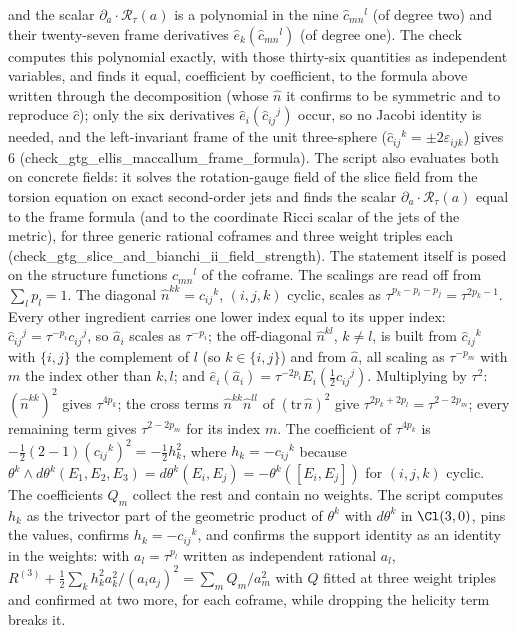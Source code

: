 and the scalar $\partial_{a}\cdot\mathcal{R}_{\tau}(a)$ is a polynomial in the nine $\hat c_{mn}{}^{l}$ (of degree two) and their twenty-seven frame derivatives $\hat e_{k}(\hat c_{mn}{}^{l})$ (of degree one). The check computes this polynomial exactly, with those thirty-six quantities as independent variables, and finds it equal, coefficient by coefficient, to the formula above written through the decomposition (whose $\hat n$ it confirms to be symmetric and to reproduce $\hat c$); only the six derivatives $\hat e_{i}(\hat c_{ij}{}^{j})$ occur, so no Jacobi identity is needed, and the left-invariant frame of the unit three-sphere ($\hat c_{ij}{}^{k} = \pm 2\varepsilon_{ijk}$) gives $6$ (check\_gtg\_ellis\_maccallum\_frame\_formula). The script also evaluates both on concrete fields: it solves the rotation-gauge field of the slice field from the torsion equation on exact second-order jets and finds the scalar $\partial_{a}\cdot\mathcal{R}_{\tau}(a)$ equal to the frame formula (and to the coordinate Ricci scalar of the jets of the metric), for three generic rational coframes and three weight triples each (check\_gtg\_slice\_and\_bianchi\_ii\_field\_strength). The statement itself is posed on the structure functions $c_{mn}{}^{l}$ of the coframe. The scalings are read off from $\sum_{l}p_{l} = 1$. The diagonal $\hat n^{kk} = \hat c_{ij}{}^{k}$, $(i, j, k)$ cyclic, scales as $\tau^{p_{k} - p_{i} - p_{j}} = \tau^{2p_{k} - 1}$. Every other ingredient carries one lower index equal to its upper index: $\hat c_{ij}{}^{j} = \tau^{-p_{i}}c_{ij}{}^{j}$, so $\hat a_{i}$ scales as $\tau^{-p_{i}}$; the off-diagonal $\hat n^{kl}$, $k \neq l$, is built from $\hat c_{ij}{}^{k}$ with $\{i, j\}$ the complement of $l$ (so $k \in \{i, j\}$) and from $\hat a$, all scaling as $\tau^{-p_{m}}$ with $m$ the index other than $k, l$; and $\hat e_{i}(\hat a_{i}) = \tau^{-2p_{i}}E_{i}(\tfrac12 c_{ij}{}^{j})$. Multiplying by $\tau^{2}$: $(\hat n^{kk})^{2}$ gives $\tau^{4p_{k}}$; the cross terms $\hat n^{kk}\hat n^{ll}$ of $(\mathrm{tr}\,\hat n)^{2}$ give $\tau^{2p_{k} + 2p_{l}} = \tau^{2 - 2p_{m}}$; every remaining term gives $\tau^{2 - 2p_{m}}$ for its index $m$. The coefficient of $\tau^{4p_{k}}$ is $-\tfrac12(2 - 1)(c_{ij}{}^{k})^{2} = -\tfrac12 h_{k}^{2}$, where $h_{k} = -c_{ij}{}^{k}$ because $\theta^{k}\wedge d\theta^{k}(E_{1}, E_{2}, E_{3}) = d\theta^{k}(E_{i}, E_{j}) = -\theta^{k}([E_{i}, E_{j}])$ for $(i, j, k)$ cyclic. The coefficients $Q_{m}$ collect the rest and contain no weights. The script computes $h_{k}$ as the trivector part of the geometric product of $\theta^{k}$ with $d\theta^{k}$ in $\Cl(3,0)$, pins the values, confirms $h_{k} = -c_{ij}{}^{k}$, and confirms the support identity as an identity in the weights: with $a_{l} = \tau^{p_{l}}$ written as independent rational $a_{l}$, $R^{(3)} + \tfrac12\sum_{k}h_{k}^{2}a_{k}^{2}/(a_{i}a_{j})^{2} = \sum_{m}Q_{m}/a_{m}^{2}$ with $Q$ fitted at three weight triples and confirmed at two more, for each coframe, while dropping the helicity term breaks it.


